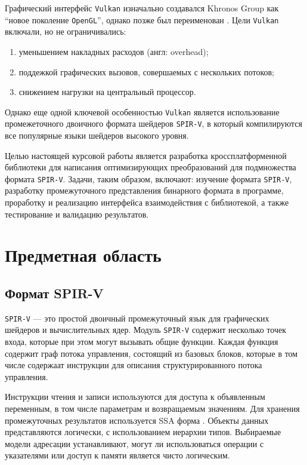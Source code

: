 \documentclass[14pt]{extarticle}
\begin{document}
Графический интерфейс \texttt{Vulkan} изначально создавался Khronos Group как \enquote{новое поколение \texttt{OpenGL}}, однако позже был переименован \cite{vlk19}. Цели \texttt{Vulkan} включали, но не ограничивались:
\begin{enumerate}
	\item уменьшением накладных расходов (англ: overhead);
	\item поддежкой графических вызовов, совершаемых с нескольких потоков;
	\item снижением нагрузки на центральный процессор.
\end{enumerate}

Однако еще одной ключевой особенностью \texttt{Vulkan} является использование промежеточного двоичного формата шейдеров \texttt{SPIR-V}, в который компилируются все популярные языки шейдеров высокого уровня.

Целью настоящей курсовой работы является разработка кроссплатформенной библиотеки для написания оптимизирующих преобразований для подмножества формата \texttt{SPIR-V}. Задачи, таким образом, включают: изучение формата \texttt{SPIR-V}, разработку промежуточного представления бинарного формата в программе, проработку и реализацию интерфейса взаимодействия с библиотекой, а также тестирование и валидацию результатов.


\newpage
\section{Предметная область}
\subsection{Формат SPIR-V}
\texttt{SPIR-V} --- это простой двоичный промежуточный язык для графических шейдеров и вычислительных ядер. Модуль \texttt{SPIR-V} содержит несколько точек входа, которые при этом могут вызывать общие функции. Каждая функция содержит граф потока управления, состоящий из базовых блоков, которые в том числе содержаат инструкции для описания структурированного потока управления. 

Инструкции чтения и записи используются для доступа к объявленным переменным, в том числе параметрам и возвращаемым значениям. Для хранения промежуточных результатов используется SSA форма \cite{ssa98}. Объекты данных представляются логически, с использованием иерархии типов. Выбираемые модели адресации устанавливают, могут ли использоваться операции с указателями или доступ к памяти является чисто логическим.
\end{document}

